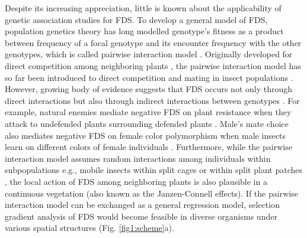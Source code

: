 \documentclass[12pt,]{article}
\begin{document}
Despite its increasing appreciation, little is known about the applicability of genetic association studies for FDS. To develop a general model of FDS, population genetics theory has long modelled genotype’s fitness as a product between frequency of a focal genotype and its encounter frequency with the other genotypes, which is called pairwise interaction model \citep{schutz1969inter, cockerham1972frequency, asmussen_frequency-dependent_1990, trotter2007frequency, schneider_maximization_2008}. Originally developed for direct competition among neighboring plants \citep{schutz1969inter}, the pairwise interaction model has so far been introduced to direct competition and mating in insect populations \citep{alvarez2005models}. However, growing body of evidence suggests that FDS occurs not only through direct interactions but also through indirect interactions between genotypes \citep{antonovics1984experimental,gigord2001negative,takahashi2010negative,sato2017herbivore}. For example, natural enemies mediate negative FDS on plant resistance when they attack to undefended plants surrounding defended plants \citep{antonovics1984experimental, brunet2000disease, sato2017herbivore}. Male's mate choice also mediates negative FDS on female color polymorphism when male insects learn on different colors of female individuals \citep{van2001frequency,takahashi2010negative}. Furthermore, while the pairwise interaction model assumes random interactions among individuals within subpopulations e.g., mobile insects within split cages \citep{cosmidis1999rarer,fitzpatrick2007maintaining,takahashi2014evolution} or within split plant patches \citep{sato2017herbivore}, the local action of FDS among neighboring plants is also plausible in a continuous vegetation \citep{janzen1970herbivores, connell1971role, browne2016frequency} (also known as the Janzen-Connell effects). If the pairwise interaction model can be exchanged as a general regression model, selection gradient analysis of FDS would become feasible in diverse organisms under various spatial structures (Fig. \ref{fig1:scheme}a).
\end{document}

